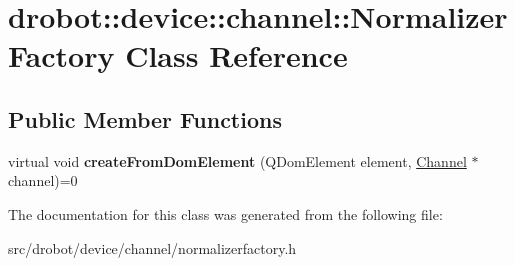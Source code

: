 \hypertarget{classdrobot_1_1device_1_1channel_1_1NormalizerFactory}{\section{drobot\-:\-:device\-:\-:channel\-:\-:Normalizer\-Factory Class Reference}
\label{classdrobot_1_1device_1_1channel_1_1NormalizerFactory}
}
\subsection*{Public Member Functions}
\begin{DoxyCompactItemize}
\item 
\hypertarget{classdrobot_1_1device_1_1channel_1_1NormalizerFactory_aaae0471f5e1d68557a8628e348f5c81e}{virtual void {\bfseries create\-From\-Dom\-Element} (Q\-Dom\-Element element, \hyperlink{classdrobot_1_1device_1_1channel_1_1Channel}{Channel} $\ast$channel)=0}\label{classdrobot_1_1device_1_1channel_1_1NormalizerFactory_aaae0471f5e1d68557a8628e348f5c81e}

\end{DoxyCompactItemize}


The documentation for this class was generated from the following file\-:\begin{DoxyCompactItemize}
\item 
src/drobot/device/channel/normalizerfactory.\-h\end{DoxyCompactItemize}

